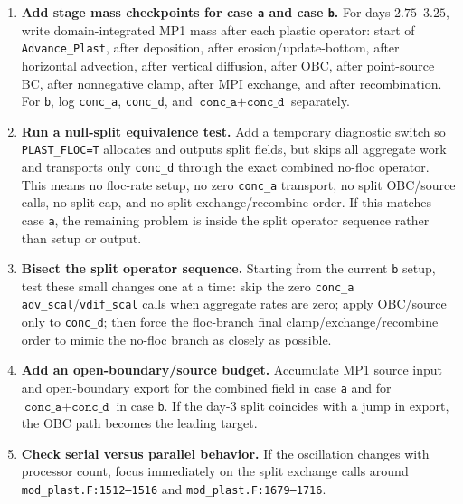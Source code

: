 \documentclass[11pt]{article}
\begin{document}
\begin{enumerate}
\item \textbf{Add stage mass checkpoints for case \texttt{a} and case
\texttt{b}.} For days \(2.75\)--\(3.25\), write domain-integrated MP1 mass after
each plastic operator: start of \texttt{Advance\_Plast}, after deposition,
after erosion/update-bottom, after horizontal advection, after vertical
diffusion, after OBC, after point-source BC, after nonnegative clamp, after MPI
exchange, and after recombination.  For \texttt{b}, log \texttt{conc\_a},
\texttt{conc\_d}, and \(\texttt{conc\_a}+\texttt{conc\_d}\) separately.

\item \textbf{Run a null-split equivalence test.} Add a temporary diagnostic
switch so \texttt{PLAST\_FLOC=T} allocates and outputs split fields, but skips
all aggregate work and transports only \texttt{conc\_d} through the exact
combined no-floc operator.  This means no floc-rate setup, no zero
\texttt{conc\_a} transport, no split OBC/source calls, no split cap, and no
split exchange/recombine order.  If this matches case \texttt{a}, the remaining
problem is inside the split operator sequence rather than setup or output.

\item \textbf{Bisect the split operator sequence.} Starting from the current
\texttt{b} setup, test these small changes one at a time: skip the zero
\texttt{conc\_a} \texttt{adv\_scal}/\texttt{vdif\_scal} calls when aggregate
rates are zero; apply OBC/source only to \texttt{conc\_d}; then force the
floc-branch final clamp/exchange/recombine order to mimic the no-floc branch as
closely as possible.

\item \textbf{Add an open-boundary/source budget.} Accumulate MP1 source input
and open-boundary export for the combined field in case \texttt{a} and for
\(\texttt{conc\_a}+\texttt{conc\_d}\) in case \texttt{b}.  If the day-3 split
coincides with a jump in export, the OBC path becomes the leading target.

\item \textbf{Check serial versus parallel behavior.} If the oscillation changes
with processor count, focus immediately on the split exchange calls around
\texttt{mod\_plast.F:1512--1516} and \texttt{mod\_plast.F:1679--1716}.
\end{enumerate}
\end{document}
